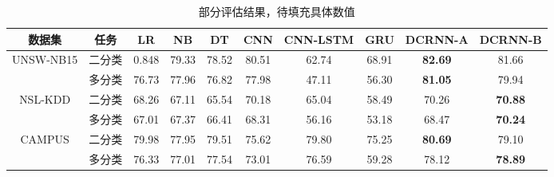 \begin{table*}[t]
    \small
    \caption{部分评估结果，待填充具体数值}
    \label{table2}
    \centering
    \begin{tabular}{c|c|ccc|ccc|cc}
    \toprule
    
     数据集 &  任务  &  
     LR &  NB & DT & CNN & CNN-LSTM & GRU & DCRNN-A & DCRNN-B \\
    \midrule
    
    
    UNSW-NB15 & 二分类 & 0.848 & 79.33 & 78.52 &  80.51 & 62.74 & 68.91 & \textbf{82.69} & 81.66 \\ 
    
    & 多分类 &76.73 & 77.96 & 76.82 & 77.98 & 47.11 & 56.30 & \textbf{81.05} & 79.94 \\
    
    \midrule
    NSL-KDD & 二分类 & 68.26 & 67.11 & 65.54 & 70.18 & 65.04 & 58.49 & 70.26 & \textbf{70.88} \\
    & 多分类 & 67.01 & 67.37 & 66.41 & 68.31 & 56.16 & 53.18 & 68.47 & \textbf{70.24} \\
    \midrule
    CAMPUS & 二分类 & 79.98 & 77.95 & 79.51 & 75.62 & 79.80 & 75.25 & \textbf{80.69} & 79.10\\
    & 多分类 & 76.33 & 77.01 & 77.54 & 73.01 & 76.59 & 59.28 & 78.12 & \textbf{78.89}\\
    
     \bottomrule
    
    \end{tabular}
    \end{table*}
